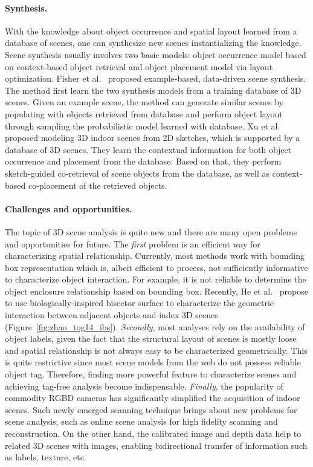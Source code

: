 

\paragraph*{Synthesis.}
With the knowledge about object occurrence and spatial layout learned from a database of scenes,
one can synthesize new scenes instantializing the knowledge.
Scene synthesis usually involves two basic models: object occurrence model based on context-based object retrieval
and object placement model via layout optimization.
Fisher et al.~ proposed example-based, data-driven scene synthesis.
The method first learn the two synthesis models from a training database of 3D scenes.
Given an example scene, the method can generate similar scenes by populating with objects retrieved
from database and perform object layout through sampling the probabilistic model learned with database.
Xu et al.~ proposed modeling 3D indoor scenes from 2D sketches, which is supported
by a database of 3D scenes. They learn the contextual information
for both object occurrence and placement from the database.
Based on that, they perform sketch-guided co-retrieval of scene objects from the database,
as well as context-based co-placement of the retrieved objects.



\paragraph*{Challenges and opportunities.}
The topic of 3D scene analysis is quite new and there are many open problems and opportunities for future.
The \emph{first} problem is an efficient way for characterizing spatial relationship.
Currently, most methods work with bounding box representation which is, albeit efficient to process,
not sufficiently informative to characterize object interaction.
For example, it is not reliable to determine the object enclosure relationship based on bounding box.
Recently, He et al.~ propose to use biologically-inspired bisector surface to characterize the
geometric interaction between adjacent objects and index 3D scenes (Figure~\ref{fig:zhao_tog14_ibs}).
%
\emph{Secondly}, most analyses rely on the availability of object labels, given the fact that the structural layout
of scenes is mostly loose and spatial relationship is not always easy to be characterized geometrically.
This is quite restrictive since most scene models from the web do not possess reliable object tag.
Therefore, finding more powerful feature to characterize scenes and achieving tag-free analysis become indispensable.
%
\emph{Finally}, the popularity of commodity RGBD cameras has significantly simplified the acquisition
of indoor scenes. Such newly emerged scanning technique brings about new problems for scene analysis, such as online scene analysis
for high fidelity scanning and reconstruction. On the other hand, the calibrated image and depth data
help to related 3D scenes with images, enabling bidirectional transfer of information such as labels, texture, etc.

